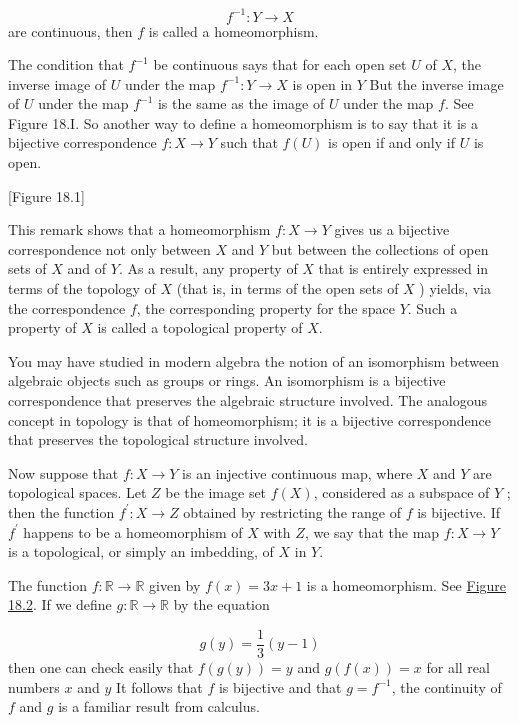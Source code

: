 \[
f^{-1} : Y \rightarrow X
\]
are continuous, then \(f\) is called a homeomorphism.

The condition that \(f^{-1}\) be continuous says that for each open set \(U\) of \(X\), the inverse image of \(U\) under the map \(f^{-1} : Y \rightarrow X\) is open in \(Y\) But the inverse image of \(U\) under the map \(f^{-1}\) is the same as the image of \(U\) under the map \(f\). See Figure 18.I. So another way to define a homeomorphism is to say that it is a bijective correspondence \(f : X \rightarrow Y\) such that \(f( U)\) is open if and only if \(U\) is open.

[Figure 18.1]

This remark shows that a homeomorphism \(f : X \rightarrow Y\) gives us a bijective correspondence not only between \(X\) and \(Y\) but between the collections of open sets of \(X\) and of \(Y\). As a result, any property of \(X\) that is entirely expressed in terms of the topology of \(X\) (that is, in terms of the open sets of \(X\) ) yields, via the correspondence \(f\), the corresponding property for the space \(Y\). Such a property of \(X\) is called a topological property of \(X\).

You may have studied in modern algebra the notion of an isomorphism between algebraic objects such as groups or rings. An isomorphism is a bijective correspondence that preserves the algebraic structure involved. The analogous concept in topology is that of homeomorphism; it is a bijective correspondence that preserves the topological structure involved.

Now suppose that \(f : X \rightarrow Y\) is an injective continuous map, where \(X\) and \(Y\) are topological spaces. Let \(Z\) be the image set \(f( X)\), considered as a subspace of \(Y\) ; then the function \(f^{\prime } : X \rightarrow Z\) obtained by restricting the range of \(f\) is bijective. If \(f^{\prime }\) happens to be a homeomorphism of \(X\) with \(Z\), we say that the map \(f : X \rightarrow Y\) is a topological, or simply an imbedding, of \(X\) in \(Y\).

\begin{centeredblock}
\begin{example}
\label{ex:\thesection.\theexample}
 The function \(f : \mathbb{R} \rightarrow \mathbb{R}\) given by \(f(x) = {3x} + 1\) is a homeomorphism. See \hyperref[fig:18.2]{Figure 18.2}. If we define \(g : \mathbb{R} \rightarrow \mathbb{R}\) by the equation

 \[
 g( y) = \frac{1}{3}( {y - 1})
 \]
 then one can check easily that \(f( {g( y) }) = y\) and \(g( {f(x) }) = x\) for all real numbers \(x\) and \(y\) It follows that \(f\) is bijective and that \(g = f^{-1}\), the continuity of \(f\) and \(g\) is a familiar result from calculus.
\end{example}
\end{centeredblock}

